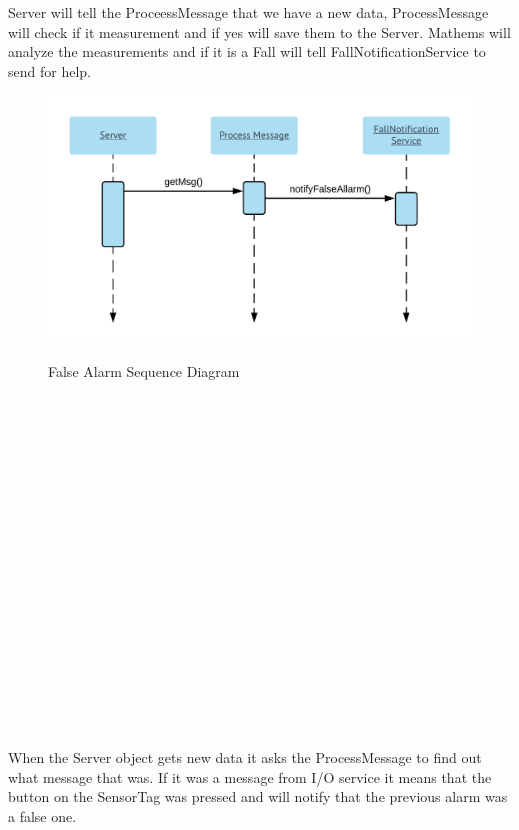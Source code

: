 \documentclass[hidelinks,conference,12pt]{IEEETran}
\begin{document}
Server will tell the ProceessMessage that we have a new data, ProcessMessage will check if it measurement and if yes will save them to the Server. Mathems will analyze the measurements and if it is a Fall will tell FallNotificationService to send for help.

\FloatBarrier
\begin{figure}[!h]
	\centering
	\caption{False Alarm Sequence Diagram}
	\includegraphics[scale=0.43]{images/Seq_FalseAl.png}
	\label{img:falseal}
\end{figure}
\FloatBarrier
\hskip 1cm \\\\\\\\\\\\\\\\\\\\\\\\\\\\\\\\\\\\
When the Server object gets new data it asks the ProcessMessage to find out what message that was. If it was a message from I/O service it means that the button on the SensorTag was pressed and will notify that the previous alarm was a false one.
\end{document}
